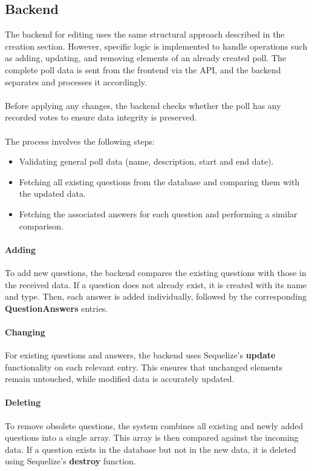 \documentclass[a4paper,12pt]{report}
\begin{document}
\subsection{Backend}
The backend for editing uses the same structural approach described in the creation section. However, specific logic is implemented to handle operations such as adding, updating, and removing elements of an already created poll. The complete poll data is sent from the frontend via the API, and the backend separates and processes it accordingly. \\ \\
Before applying any changes, the backend checks whether the poll has any recorded votes to ensure data integrity is preserved. \\ \\
The process involves the following steps:
\begin{itemize}
	\item Validating general poll data (name, description, start and end date).
	\item Fetching all existing questions from the database and comparing them with the updated data.
	\item Fetching the associated answers for each question and performing a similar comparison.
\end{itemize}

\paragraph{Adding}
To add new questions, the backend compares the existing questions with those in the received data. If a question does not already exist, it is created with its name and type. Then, each answer is added individually, followed by the corresponding \textbf{QuestionAnswers} entries.

\paragraph{Changing}
For existing questions and answers, the backend uses Sequelize's \textbf{update} functionality on each relevant entry. This ensures that unchanged elements remain untouched, while modified data is accurately updated.

\paragraph{Deleting}
To remove obsolete questions, the system combines all existing and newly added questions into a single array. This array is then compared against the incoming data. If a question exists in the database but not in the new data, it is deleted using Sequelize’s \textbf{destroy} function.
\end{document}
